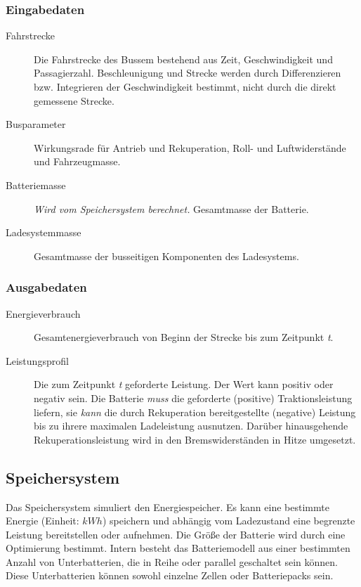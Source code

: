 \subsubsection{Eingabedaten}
\begin{description}
	\item[Fahrstrecke] Die Fahrstrecke des Bussem bestehend aus Zeit, Geschwindigkeit und Passagierzahl. Beschleunigung und Strecke werden durch Differenzieren bzw. Integrieren der Geschwindigkeit bestimmt, nicht durch die direkt gemessene Strecke.
	\item[Busparameter] Wirkungsrade für Antrieb und Rekuperation, Roll- und Luftwiderstände und Fahrzeugmasse.
	\item[Batteriemasse] \emph{Wird vom Speichersystem berechnet.} Gesamtmasse der Batterie.
	\item[Ladesystemmasse] Gesamtmasse der busseitigen Komponenten des Ladesystems.
\end{description}

\subsubsection{Ausgabedaten}
\begin{description}
	\item[Energieverbrauch] Gesamtenergieverbrauch von Beginn der Strecke bis zum  Zeitpunkt \emph{t}.
	\item[Leistungsprofil] Die zum Zeitpunkt \emph{t} geforderte Leistung. Der Wert kann positiv oder negativ sein. Die Batterie \emph{muss} die geforderte (positive) Traktionsleistung liefern, sie \emph{kann} die durch Rekuperation bereitgestellte (negative) Leistung bis zu ihrere maximalen Ladeleistung ausnutzen. Darüber hinausgehende Rekuperationsleistung wird in den Bremswiderständen in Hitze umgesetzt.
\end{description}

\subsection{Speichersystem}
Das Speichersystem simuliert den Energiespeicher. Es kann eine bestimmte Energie (Einheit: $kWh$) speichern und abhängig vom Ladezustand eine begrenzte Leistung bereitstellen oder aufnehmen. Die Größe der Batterie wird durch eine Optimierung bestimmt. Intern besteht das Batteriemodell aus einer bestimmten Anzahl von Unterbatterien, die in Reihe oder parallel geschaltet sein können. Diese Unterbatterien können sowohl einzelne Zellen oder Batteriepacks sein.

